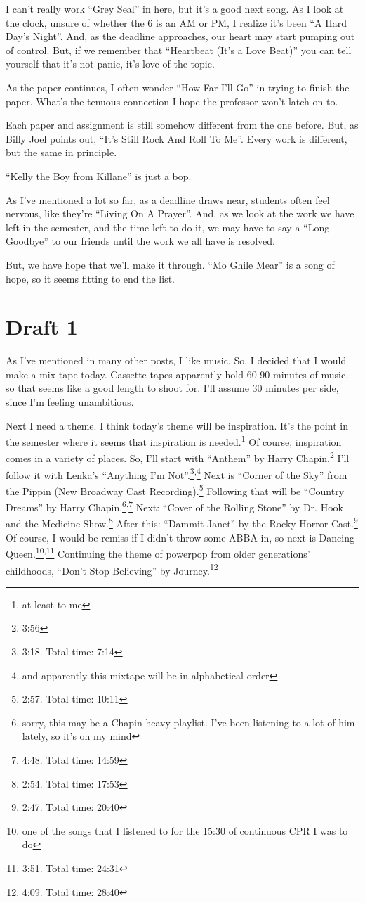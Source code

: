 \documentclass[12pt]{article}[titlepage]
\newcommand{\say}[1]{``#1''}
\newcommand{\1}{\={a}}
\newcommand{\2}{\={e}}
\newcommand{\3}{\={\i}}
\newcommand{\4}{\=o}
\newcommand{\5}{\=u}
\newcommand{\6}{\={A}}
\renewcommand{\,}{\textsuperscript{,}}
\begin{document}
I can't really work \say{Grey Seal} in here, but it's a good next song.
As I look at the clock, unsure of whether the 6 is an AM or PM, I realize it's been \say{A Hard Day's Night}.
And, as the deadline approaches, our heart may start pumping out of control.
But, if we remember that \say{Heartbeat (It's a Love Beat)} you can tell yourself that it's not panic, it's love of the topic.

As the paper continues, I often wonder \say{How Far I'll Go} in trying to finish the paper.
What's the tenuous connection I hope the professor won't latch on to.

Each paper and assignment is still somehow different from the one before.
But, as Billy Joel points out, \say{It's Still Rock And Roll To Me}.
Every work is different, but the same in principle.

\say{Kelly the Boy from Killane} is just a bop.

As I've mentioned a lot so far, as a deadline draws near, students often feel nervous, like they're \say{Living On A Prayer}.
And, as we look at the work we have left in the semester, and the time left to do it, we may have to say a \say{Long Goodbye} to our friends until the work we all have is resolved.

But, we have hope that we'll make it through.
\say{Mo Ghile Mear} is a song of hope, so it seems fitting to end the list.

\section{Draft 1}
As I've mentioned in many other posts, I like music.
So, I decided that I would make a mix tape today.
Cassette tapes apparently hold 60-90 minutes of music, so that seems like a good length to shoot for.
I'll assume 30 minutes per side, since I'm feeling unambitious.

Next I need a theme.
I think today's theme will be inspiration.
It's the point in the semester where it seems that inspiration is needed.\footnote{at least to me}
Of course, inspiration comes in a variety of places.
So, I'll start with \say{Anthem} by Harry Chapin.\footnote{3:56}
I'll follow it with Lenka's \say{Anything I'm Not}.\footnote{3:18. Total time: 7:14}\,\footnote{and apparently this mixtape will be in alphabetical order}
Next is \say{Corner of the Sky} from the Pippin (New Broadway Cast Recording).\footnote{2:57. Total time: 10:11}
Following that will be \say{Country Dreams} by Harry Chapin.\footnote{sorry, this may be a Chapin heavy playlist. I've been listening to a lot of him lately, so it's on my mind}\,\footnote{4:48. Total time: 14:59}
Next: \say{Cover of the Rolling Stone} by Dr. Hook and the Medicine Show.\footnote{2:54. Total time: 17:53}
After this: \say{Dammit Janet} by the Rocky Horror Cast.\footnote{2:47. Total time: 20:40}
Of course, I would be remiss if I didn't throw some ABBA in, so next is Dancing Queen.\footnote{one of the songs that I listened to for the 15:30 of continuous CPR I was to do}\,\footnote{3:51. Total time: 24:31}
Continuing the theme of powerpop from older generations' childhoods, \say{Don't Stop Believing} by Journey.\footnote{4:09. Total time: 28:40}
\end{document}
